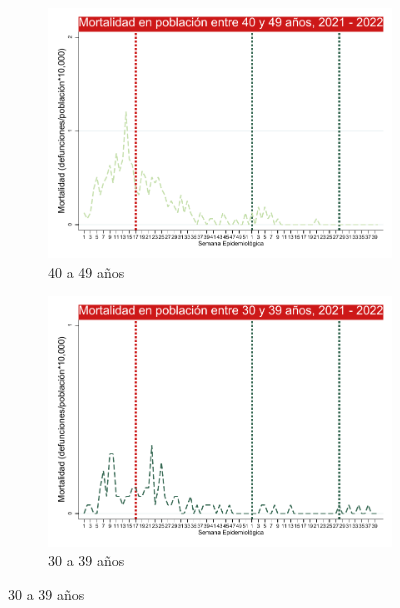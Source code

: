 \documentclass[xcolor=table]{beamer}
\begin{document}
\begin{frame}
\begin{figure}
\begin{subfigure}[b]{0.3\textwidth}
		\includegraphics[width=\textwidth]{../figuras/mortalidad_edad_40.pdf}
		\caption{40 a 49 años}
	\end{subfigure}
	\hfill
	\begin{subfigure}[b]{0.3\textwidth}
		\centering
		\includegraphics[width=\textwidth]{../figuras/mortalidad_edad_30.pdf}
		\caption{30 a 39 años}
	\end{subfigure}
	
	\end{figure}
\end{frame}
\end{document}
